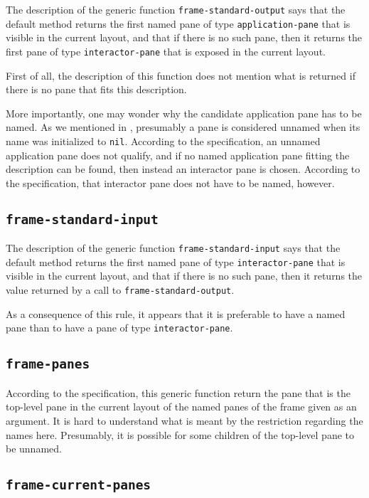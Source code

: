 The description of the generic function \texttt{frame-standard-output}
says that the default method returns the first named pane of type
\texttt{application-pane} that is visible in the current layout, and
that if there is no such pane, then it returns the first pane of type
\texttt{interactor-pane} that is exposed in the current layout.

First of all, the description of this function does not mention what
is returned if there is no pane that fits this description.

More importantly, one may wonder why the candidate application pane
has to be named.  As we mentioned in
,
presumably a pane is considered unnamed when its name was initialized
to \texttt{nil}.  According to the specification, an unnamed
application pane does not qualify, and if no named application pane
fitting the description can be found, then instead an interactor pane
is chosen.  According to the specification, that interactor pane does
not have to be named, however.

\subsection{\texttt{frame-standard-input}}

The description of the generic function \texttt{frame-standard-input}
says that the default method returns the first named pane of type
\texttt{interactor-pane} that is visible in the current layout, and
that if there is no such pane, then it returns the value returned by a
call to \texttt{frame-standard-output}.

As a consequence of this rule, it appears that it is preferable to
have a named pane than to have a pane of type
\texttt{interactor-pane}.

\subsection{\texttt{frame-panes}}

According to the specification, this generic function return the pane
that is the top-level pane in the current layout of the named panes of
the frame given as an argument.  It is hard to understand what is
meant by the restriction regarding the names here.  Presumably, it is
possible for some children of the top-level pane to be unnamed.

\subsection{\texttt{frame-current-panes}}

